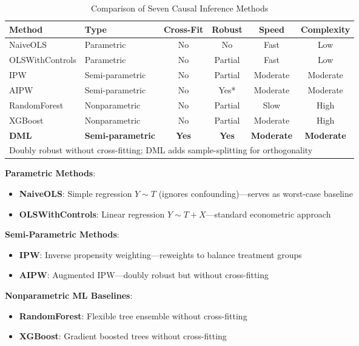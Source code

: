 \begin{table}[htbp]
\centering
\caption{Comparison of Seven Causal Inference Methods}
\label{tab:method_comparison}
\begin{tabular}{llcccc}
\hline
\textbf{Method} & \textbf{Type} & \textbf{Cross-Fit} & \textbf{Robust} & \textbf{Speed} & \textbf{Complexity} \\
\hline
NaiveOLS & Parametric & No & No & Fast & Low \\
OLSWithControls & Parametric & No & Partial & Fast & Low \\
IPW & Semi-parametric & No & Partial & Moderate & Moderate \\
AIPW & Semi-parametric & No & Yes* & Moderate & Moderate \\
RandomForest & Nonparametric & No & Partial & Slow & High \\
XGBoost & Nonparametric & No & Partial & Moderate & High \\
\textbf{DML} & \textbf{Semi-parametric} & \textbf{Yes} & \textbf{Yes} & \textbf{Moderate} & \textbf{Moderate} \\
\hline
\multicolumn{6}{l}{\small *Doubly robust without cross-fitting; DML adds sample-splitting for orthogonality}
\end{tabular}
\end{table}

\textbf{Parametric Methods}:
\begin{itemize}
    \item \textbf{NaiveOLS}: Simple regression $Y \sim T$ (ignores confounding)---serves as worst-case baseline
    \item \textbf{OLSWithControls}: Linear regression $Y \sim T + X$---standard econometric approach
\end{itemize}

\textbf{Semi-Parametric Methods}:
\begin{itemize}
    \item \textbf{IPW}: Inverse propensity weighting---reweights to balance treatment groups
    \item \textbf{AIPW}: Augmented IPW---doubly robust but without cross-fitting
\end{itemize}

\textbf{Nonparametric ML Baselines}:
\begin{itemize}
    \item \textbf{RandomForest}: Flexible tree ensemble without cross-fitting
    \item \textbf{XGBoost}: Gradient boosted trees without cross-fitting
\end{itemize}

